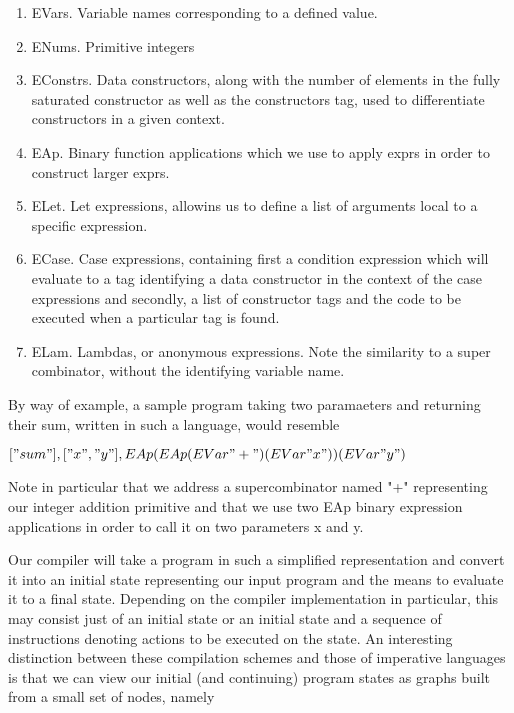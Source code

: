 \begin{enumerate}
	\item EVars. Variable names corresponding to a defined value.
	\item ENums. Primitive integers
	\item EConstrs. Data constructors, along with the number of elements in the
		  fully saturated constructor as well as the constructors tag, used to
		  differentiate constructors in a given context.
	\item EAp. Binary function applications which we use to apply exprs in order
		  to construct larger exprs.
	\item ELet. Let expressions, allowins us to define a list of arguments local
		  to a specific expression.
	\item ECase. Case expressions, containing first a condition expression which
		  will evaluate to a tag identifying a data constructor in the context
		  of the case expressions and secondly, a list of constructor tags and 
		  the code to be executed when a particular tag is found.
	\item ELam. Lambdas, or anonymous expressions. Note the similarity to a 
		  super combinator, without the identifying variable name.
\end{enumerate}

\noindent By way of example, a sample program taking two paramaeters and returning
their sum, written in such a language, would resemble

\begin{center} \( ["sum"], ["x", "y"], EAp (EAp (EVar "+") (EVar "x")) (EVar "y") \) \end{center}

\noindent Note in particular that we address a supercombinator named "+" 
representing our integer addition primitive and that we use two EAp 
binary expression applications in order to call it on two parameters x and y.

Our compiler will take a program in such a simplified representation
and convert it into an initial state representing our input program and the
means to evaluate it to a final state. Depending on the compiler implementation
in particular, this may consist just of an initial state or an initial state
and a sequence of instructions denoting actions to be executed on the state. 
An interesting 
distinction between these compilation schemes and those of imperative languages
is that we can view our initial (and continuing) program states as graphs built
from a small set of nodes, namely

